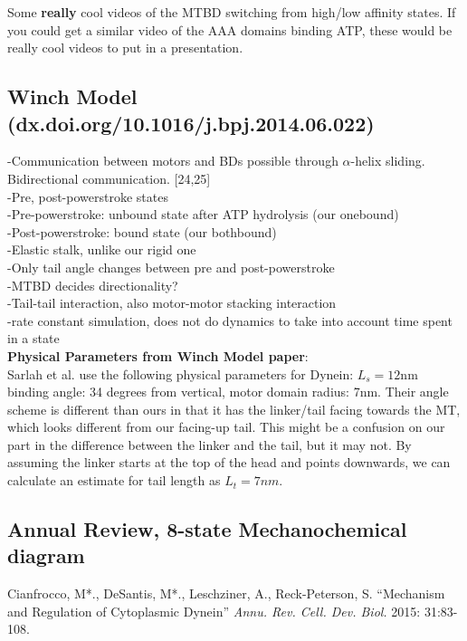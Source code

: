 \documentclass[10pt]{article} %
\begin{document}
Some \textbf{really} cool videos of the MTBD switching from high/low affinity states. If you could get a similar video of the AAA domains binding ATP, these would be really
cool videos to put in a presentation.\\

\subsection{Winch Model (dx.doi.org/10.1016/j.bpj.2014.06.022)}
-Communication between motors and BDs possible through $\alpha$-helix sliding. Bidirectional communication. [24,25]\\
-Pre, post-powerstroke states\\
-Pre-powerstroke: unbound state after ATP hydrolysis (our onebound)\\
-Post-powerstroke: bound state (our bothbound)\\
-Elastic stalk, unlike our rigid one\\
-Only tail angle changes between pre and post-powerstroke\\
-MTBD decides directionality?\\
-Tail-tail interaction, also motor-motor stacking interaction\\
-rate constant simulation, does not do dynamics to take into account time spent in a state\\

\textbf{Physical Parameters from Winch Model paper}:\\
Sarlah et al. use the following physical parameters for Dynein: $L_s = 12$nm binding angle: 34 degrees from vertical, motor
domain radius: 7nm. Their angle scheme is different than ours in that it has the linker/tail facing towards the MT, which looks different
from our facing-up tail. This might be a confusion on our part in the difference between the linker and the tail, but it may not. By assuming the linker starts at the top of the head and points downwards, we can calculate an estimate for tail length as $L_t = 7nm$.

\subsection{Annual Review, 8-state Mechanochemical diagram}
Cianfrocco, M*., DeSantis, M*., Leschziner, A., Reck-Peterson, S. ``Mechanism and Regulation of Cytoplasmic Dynein'' \textit{Annu. Rev. Cell. Dev. Biol.} 2015: 31:83-108.\\
\end{document}
